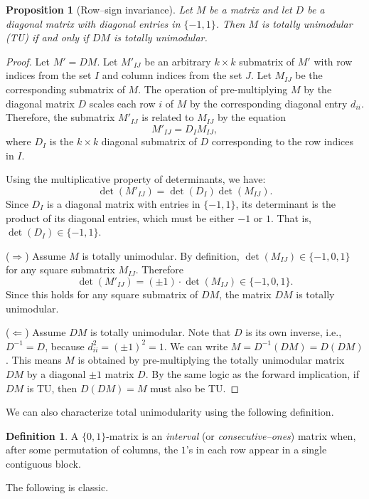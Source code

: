 \documentclass[12pt,a4paper,oneside]{amsart}
\newtheorem{proposition}{Proposition}[section]
\theoremstyle{definition}
\newtheorem{definition}{Definition}[section]
\begin{document}
\begin{proposition}[Row–sign invariance]\label{prop:rowsign}
Let $M$ be a matrix and let $D$ be a diagonal matrix with diagonal entries in $\{-1, 1\}$. Then $M$ is totally unimodular (TU) if and only if $DM$ is totally unimodular.
\end{proposition}
\begin{proof}
Let $M' = DM$. Let $M'_{IJ}$ be an arbitrary $k \times k$ submatrix of $M'$ with row indices from the set $I$ and column indices from the set $J$. Let $M_{IJ}$ be the corresponding submatrix of $M$. The operation of pre-multiplying $M$ by the diagonal matrix $D$ scales each row $i$ of $M$ by the corresponding diagonal entry $d_{ii}$. Therefore, the submatrix $M'_{IJ}$ is related to $M_{IJ}$ by the equation
\[ 
M'_{IJ} = D_I M_{IJ}, 
\] 
where $D_I$ is the $k \times k$ diagonal submatrix of $D$ corresponding to the row indices in $I$.

Using the multiplicative property of determinants, we have:
\[ 
\det(M'_{IJ}) = \det(D_I) \det(M_{IJ}). 
\]
Since $D_I$ is a diagonal matrix with entries in $\{-1, 1\}$, its determinant is the product of its diagonal entries, which must be either $-1$ or $1$. That is, $\det(D_I) \in \{-1, 1\}$.

($\Longrightarrow$) Assume $M$ is totally unimodular. By definition, $\det(M_{IJ}) \in \{-1, 0, 1\}$ for any square submatrix $M_{IJ}$. Therefore
\[ 
\det(M'_{IJ}) = (\pm 1) \cdot \det(M_{IJ}) \in \{-1, 0, 1\}. 
\]
Since this holds for any square submatrix of $DM$, the matrix $DM$ is totally unimodular.

($\Longleftarrow$) Assume $DM$ is totally unimodular. Note that $D$ is its own inverse, i.e., $D^{-1} = D$, because $d_{ii}^2 = (\pm 1)^2 = 1$. We can write $M = D^{-1}(DM) = D(DM)$. This means $M$ is obtained by pre-multiplying the totally unimodular matrix $DM$ by a diagonal $\pm 1$ matrix $D$. By the same logic as the forward implication, if $DM$ is TU, then $D(DM) = M$ must also be TU.
\end{proof}

We can also characterize total unimodularity using the following definition.

\begin{definition}
A $\{0,1\}$-matrix is an \emph{interval} (or
\emph{consecutive–ones}) matrix when, after some permutation of columns, the $1$’s in each row appear in a single contiguous block.
\end{definition}

The following is classic.
\end{document}

